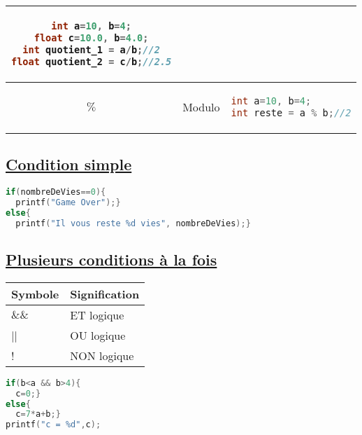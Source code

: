 \documentclass[a3paper,12pt]{article}
\begin{document}
\begin{minipage}[t]{0.49\textwidth}
\begin{tcolorbox}[title=Opérations de base, fonttitle=\large, top=0pt, bottom=3pt, boxsep=1pt,
colback=white,
  colframe=pink!80!white,, 
  colbacktitle=pink!80!white,
  coltitle=white,]
\begin{tabular}{|c|c|p{7cm}|}
\begin{minipage}[t]{6.5cm}
\begin{lstlisting}[language=C, basicstyle=\normalsize , aboveskip=5pt, belowskip=20pt]
int a=10, b=4;
float c=10.0, b=4.0;
int quotient_1 = a/b;//2
float quotient_2 = c/b;//2.5
\end{lstlisting}
\vspace{-\baselineskip}
\end{minipage} \\
\hline
$\%$ & Modulo & 
\begin{minipage}[t]{6.5cm}
\vspace{-\baselineskip}
\begin{lstlisting}[language=C, basicstyle=\normalsize , aboveskip=5pt, belowskip=20pt]
int a=10, b=4;
int reste = a % b;//2
\end{lstlisting}
\vspace{-\baselineskip}
\end{minipage} \\
\hline
\end{tabular}
\end{tcolorbox}

\begin{tcolorbox}[title=Conditions, fonttitle=\large, top=0pt, bottom=3pt, boxsep=1pt,colback=white,
  colframe=black!50, 
  colbacktitle=black!50,
  coltitle=white,]
\vspace{0.5em}
\subsection*{{\small \underline{Condition simple}}}
\vspace{-0.5em}
\begin{lstlisting}[language=C,showstringspaces=false]
if(nombreDeVies==0){
  printf("Game Over");}
else{
  printf("Il vous reste %d vies", nombreDeVies);}
\end{lstlisting}
\vspace{-1em}
\subsection*{{\small \underline{Plusieurs conditions à la fois}}}
\begin{tabular}{|l|p{4cm}|}
\hline
\textbf{Symbole} & \textbf{Signification}\\
\hline
$\&\&$ & ET logique\\
\hline
|| & OU logique\\
\hline
! & NON logique\\
\hline
\end{tabular}
\begin{lstlisting}[language=C,showstringspaces=false]
if(b<a && b>4){
  c=0;}
else{
  c=7*a+b;}
printf("c = %d",c);
\end{lstlisting}
\end{tcolorbox}


\end{minipage}
\end{document}
